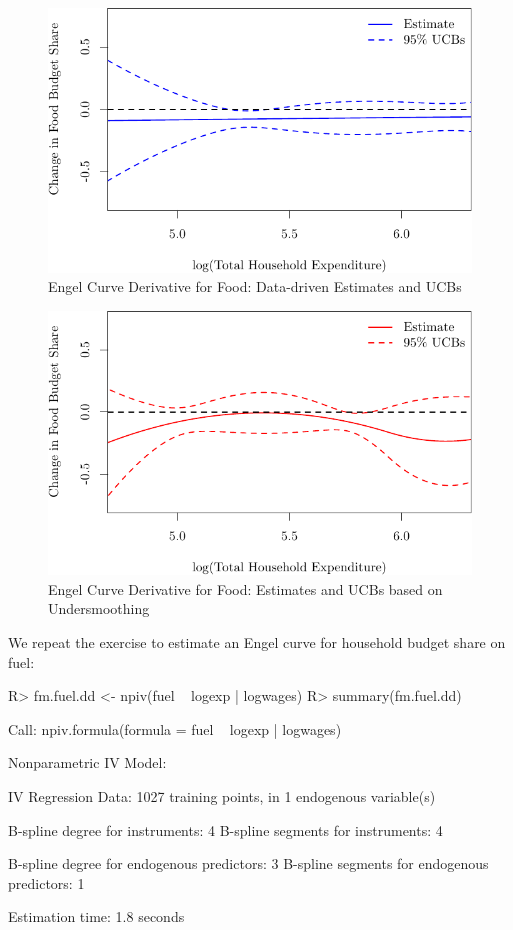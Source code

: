 \documentclass[
]{jss}
\begin{document}
\begin{figure}
\centering
\includegraphics{npiv_files/figure-latex/food-dd-deriv-1.pdf}
\caption{Engel Curve Derivative for Food: Data-driven Estimates and
UCBs}
\end{figure}

\begin{figure}
\centering
\includegraphics{npiv_files/figure-latex/food-det-deriv-1.pdf}
\caption{Engel Curve Derivative for Food: Estimates and UCBs based on
Undersmoothing}
\end{figure}

We repeat the exercise to estimate an Engel curve for household budget
share on fuel:

\begin{CodeChunk}
\begin{CodeInput}
R> fm.fuel.dd <- npiv(fuel ~ logexp | logwages)
R> summary(fm.fuel.dd)
\end{CodeInput}
\begin{CodeOutput}
Call:
npiv.formula(formula = fuel ~ logexp | logwages)

Nonparametric IV Model:

IV Regression Data: 1027 training points, in 1 endogenous variable(s)

B-spline degree for instruments:             4
B-spline segments for instruments:           4

B-spline degree for endogenous predictors:   3
B-spline segments for endogenous predictors: 1

Estimation time: 1.8 seconds
\end{CodeOutput}
\end{CodeChunk}
\end{document}

